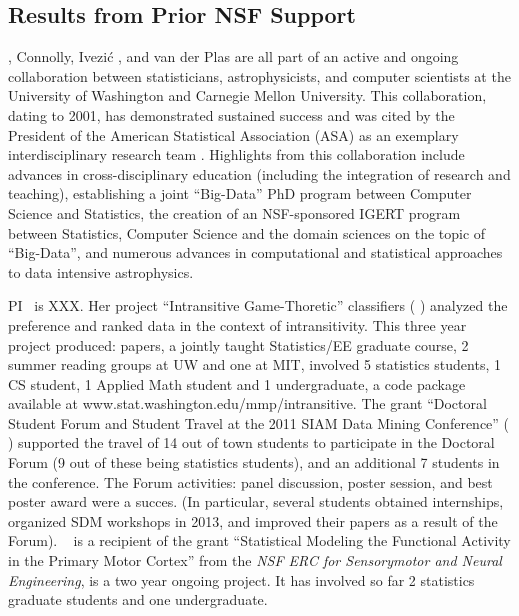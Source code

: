 \subsection{             Results from Prior NSF Support             }
\label{sec:priorNSF}

\meila, Connolly, Ivezi\'{c} , and van der Plas are all part of an active
and ongoing collaboration between statisticians, astrophysicists, and
computer scientists at the University of Washington and Carnegie
Mellon University.  This collaboration, dating to 2001, has
demonstrated sustained success and was cited by the President of the
American Statistical Association (ASA) as an exemplary
interdisciplinary research team \cite{straf03}. Highlights from this
collaboration include advances in cross-disciplinary education
(including the integration of research and teaching), establishing a
joint ``Big-Data'' PhD program between Computer Science and
Statistics, the creation of an NSF-sponsored IGERT program between
Statistics, Computer Science and the domain sciences on the topic of
``Big-Data'', and numerous advances in computational and statistical
approaches to data intensive astrophysics.

PI \meila\ is XXX. Her project ``Intransitive Game-Thoretic''
classifiers ( ) analyzed the preference and ranked data in the context
of intransitivity. This three year project produced: 
papers, a jointly taught Statistics/EE graduate course, 2 summer
reading groups at UW and one at MIT, involved 5 statistics students, 1
CS student, 1 Applied Math student and 1 undergraduate, a code package
available at {www.stat.washington.edu/mmp/intransitive}. The grant
``Doctoral Student Forum and Student Travel at the 2011 SIAM Data
Mining Conference'' ( ) supported the travel of 14 out of town
students to participate in the Doctoral Forum (9 out of these being
statistics students), and an additional 7 students in the
conference. The Forum activities: panel discussion, poster session,
and best poster award were a succes. (In particular, several students
obtained internships, organized SDM workshops in 2013, and improved
their papers as a result of the Forum). \meila~ is a recipient of the
grant ``Statistical Modeling the Functional Activity in the Primary
Motor Cortex'' from the {\em NSF ERC for Sensorymotor and Neural
  Engineering}, is a two year ongoing project. It has involved so far
2 statistics graduate students and one undergraduate.


